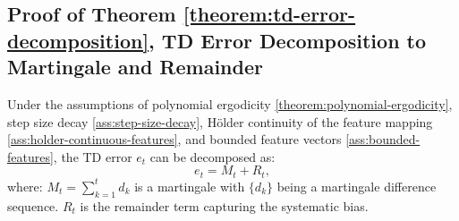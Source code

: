 \subsection{Proof of Theorem \ref{theorem:td-error-decomposition}, TD Error Decomposition to Martingale and Remainder}
\label{app:proof-TD-error}
\begin{theoremapp*}
Under the assumptions of polynomial ergodicity \ref{theorem:polynomial-ergodicity}, step size decay \ref{ass:step-size-decay}, Hölder continuity of the feature mapping \ref{ass:holder-continuous-features}, and bounded feature vectors \ref{ass:bounded-features}, the TD error \( e_t \) can be decomposed as:
\[
e_t = M_t + R_t,
\]
where: \(M_t = \sum_{k=1}^{t} d_k\) is a martingale with \( \{d_k\} \) being a martingale difference sequence.
\( R_t \) is the remainder term capturing the systematic bias.
\end{theoremapp*}
